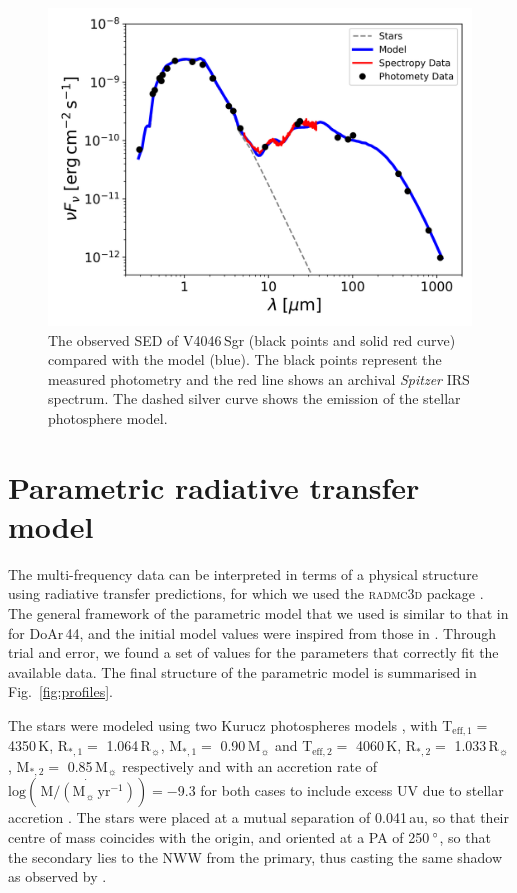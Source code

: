\documentclass[letters,usenatbib,times]{mnras}
\begin{document}
\begin{figure}
	\centering
	\includegraphics[width=\columnwidth]{SED_.png}
    \caption{The observed SED of V4046\,Sgr (black points and solid red curve) compared with the model (blue). The black points represent the measured photometry and the red line shows an archival \textit{Spitzer} IRS spectrum. The dashed silver curve shows the emission of the stellar photosphere model.}
    \label{fig:SED}
\end{figure}

\section{Parametric radiative transfer model} \label{sec:model}

The multi-frequency data can be interpreted in terms of a physical structure using radiative transfer predictions, for which we used the \textsc{radmc3d} package \citep{Dullemond_2012}. The general framework of the parametric model that we used is similar to that in \citet{2018MNRAS.477.5104C} for DoAr\,44, and the initial model values were inspired from those in \citet{Rosenfeld_2013}. Through trial and error, we found a set of values for the parameters that correctly fit the available data. The final structure of the parametric model is summarised in  Fig.~\ref{fig:profiles}.

The stars were modeled using two Kurucz photospheres models \citep{1979ApJS...40....1K, 1997A&A...318..841C}, with T$_{\mathrm{eff},1} =$ 4350\,K, R$_{*,1} =$ 1.064\,R$_{\sun}$, M$_{*,1} =$ 0.90\,M$_{\sun}$ and T$_{\mathrm{eff},2} =$ 4060\,K, R$_{*,2} =$ 1.033\,R$_{\sun}$, M$_{*,2} =$ 0.85\,M$_{\sun}$ respectively and with an accretion rate of $\mathrm{log}(\,\dot{\mathrm{M}/(\mathrm{M}_{\sun}\,\mathrm{yr^{-1}})}) = -$9.3 for both cases to include excess UV due to stellar accretion \citep{10.1111/j.1365-2966.2011.19366.x}. The stars were placed at a mutual separation of 0.041\,au, so that their centre of mass coincides with the origin, and oriented at a PA of 250\,$\hbox{$^\circ$}$, so that the secondary lies to the NWW from the primary, thus casting the same shadow as observed by \citet{dOrazi}.
\end{document}
